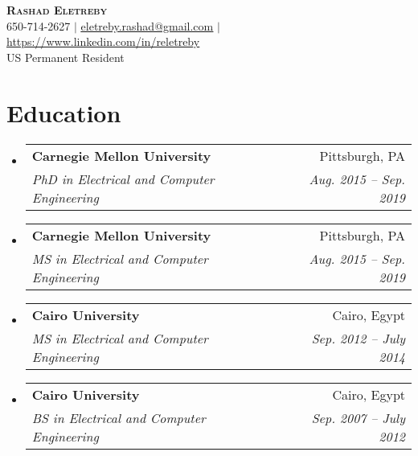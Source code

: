 \documentclass[letterpaper,11pt]{article}
\makeatletter
\newcommand{\resumeSubheading}[4]{
  \vspace{-2pt}\item
    \begin{tabular*}{0.97\textwidth}[t]{l@{\extracolsep{\fill}}r}
      \textbf{#1} & #2 \\
      \textit{\small#3} & \textit{\small #4} \\
    \end{tabular*}\vspace{-7pt}
}
\newcommand{\resumeSubHeadingListStart}{\begin{itemize}[leftmargin=0.15in, label={}]}
\newcommand{\resumeSubHeadingListEnd}{\end{itemize}}
\makeatother
\begin{document}

\begin{center}
    \textbf{\Huge \scshape Rashad Eletreby} \\ \vspace{1pt}
    \small 650-714-2627 $|$ \href{mailto:eletreby.rashad@gmail.com}{\underline{eletreby.rashad@gmail.com}} $|$ 
    \href{https://www.linkedin.com/in/reletreby}{\underline{https://www.linkedin.com/in/reletreby}} 
    \\ \vspace{3mm}
    \small US Permanent Resident
    \end{center}


\section{Education}
  \resumeSubHeadingListStart
    \resumeSubheading
      {Carnegie Mellon University}{Pittsburgh, PA}
      {PhD in Electrical and Computer Engineering}{Aug. 2015 -- Sep. 2019}
      
     \vspace{1mm}
    \resumeSubheading
      {Carnegie Mellon University}{Pittsburgh, PA}
      {MS in Electrical and Computer Engineering}{Aug. 2015 -- Sep. 2019}
      
       \vspace{1mm}
    \resumeSubheading
      {Cairo University}{Cairo, Egypt}
      {MS in Electrical and Computer Engineering}{Sep. 2012 -- July 2014}
      
      \vspace{1mm}
    \resumeSubheading
      {Cairo University}{Cairo, Egypt}
      {BS in Electrical and Computer Engineering}{Sep. 2007 -- July 2012}
  \resumeSubHeadingListEnd


%
 
\end{document}
